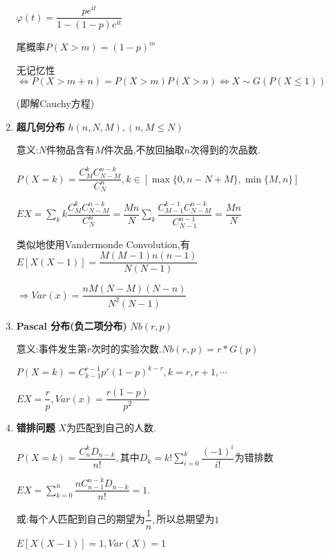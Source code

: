 \begin{enumerate}
        $ \varphi(t) = \dfrac{pe^{it}}{1-(1-p)e^{it}}$

		尾概率$ P(X>m) = (1-p)^m$

		无记忆性 $\Leftrightarrow P(X>m+n) = P(X>m)P(X>n)\Leftrightarrow X\sim G(P(X\le 1)) $

		(即解Cauchy方程)

	\item \textbf{超几何分布} $ h(n,N,M),(n, M\le N)$

		意义:$ N$件物品含有$ M$件次品,不放回抽取$ n$次得到的次品数.

		$ P(X=k) = \dfrac{C_M^kC_{N-M}^{n-k}}{C_N^n}, k \in [\max\{0, n-N + M\}, \min\{M,n\}]$

		$ EX = \sum_{k}{k\dfrac{C_M^kC_{N-M}^{n-k}}{C_N^n}}  = \dfrac{Mn}{N}\sum_{k}{\dfrac{C_{M-1}^{k-1}C_{N-M}^{n-k}}{C_{N-1}^{n-1}}} = \dfrac{Mn}{N}$

		类似地使用Vandermonde Convolution,有$ 	E[X(X-1)] = \dfrac{M(M-1)n(n-1)}{N(N-1)}$

		$\Rightarrow Var(x)  = \dfrac{nM(N-M)(N-n)}{N^2(N-1)} $

	\item \textbf{Pascal 分布(负二项分布)} $ Nb(r,p)$

		意义:事件发生第$ r$次时的实验次数.$ Nb(r, p) = r * G(p) $

		$ P(X = k) = C_{k-1}^{r-1}p^r(1-p)^{k-r}, k = r,r+1,\cdots$

		$ EX = \dfrac{r}{p}, Var(x) = \dfrac{r(1-p)}{p^2}$

	\item \textbf{错排问题} $ X $为匹配到自己的人数.

		$ P(X = k) = \dfrac{C_n^kD_{n-k}}{n!}, 其中D_k = k!\sum_{i=0}^{k}{\dfrac{(-1)^i}{i!}}为错排数$

		$ EX = \sum_{k=0}^n{\dfrac{nC_{n-1}^{n-k}D_{n-k}}{n!}} = 1. $

		或:每个人匹配到自己的期望为$ \dfrac{1}{n},$所以总期望为$ 1$

		$ E[X(X-1)] = 1, Var(X) = 1$
\end{enumerate}
